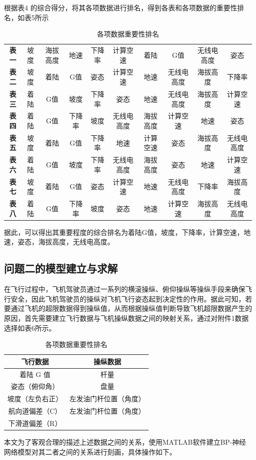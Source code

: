 \documentclass[UTF8]{ctexart}
\begin{document}
	根据表4 的综合得分，将其各项数据进行排名，得到各表和各项数据的重要性排名，如表5所示 \par
	\begin{table}[!ht]
		\centering
		\caption{各项数据重要性排名}
		\begin{tabular}{|c|ccccccccc|}
			\hline
			\textbf{表一 } & 坡度 & 海拔高度 & 地速 & 下降率 & 计算空速 & 着陆 & G值  & 无线电高度  & 姿态  \\
			\textbf{表二 } & 坡度 & 着陆 & G值  & 姿态  & 计算空速 & 地速 & 无线电高度  & 海拔高度 & 下降率 \\ 
			\textbf{表三 } & 着陆 & G值  & 坡度 & 下降率 & 姿态  & 地速 & 无线电高度  & 海拔高度 & 计算空速 \\ 
			\textbf{表四 } & 着陆 & G值  & 下降率 & 坡度 & 无线电高度  & 海拔高度 & 计算空速 & 地速 & 姿态  \\ 
			\textbf{表五 } & 坡度 & 着陆 & G值  & 下降率 & 地速 & 计算空速 & 姿态  & 海拔高度 & 无线电高度  \\ 
			\textbf{表六 } & 着陆 & G值  & 坡度 & 下降率 & 无线电高度  & 海拔高度 & 姿态  & 地速 & 计算空速 \\ 
			\textbf{表七 } & 坡度 & 着陆 & G值  & 姿态  & 计算空速 & 地速 & 无线电高度  & 下降率 & 海拔高度 \\ 
			\textbf{表八 } & 着陆 & G值  & 下降率 & 坡度 & 姿态  & 地速 & 计算空速 & 海拔高度 & 无线电高度 \\ \hline
		\end{tabular}
	\end{table}\par
	据此，可以得出其重要程度的综合排名为着陆G值，坡度，下降率，计算空速，地速，姿态，海拔高度，无线电高度。 \par
	\subsection{问题二的模型建立与求解}
	在飞行过程中，飞机驾驶员通过一系列的横滚操纵、俯仰操纵等操纵手段来确保飞行安全，因此飞机驾驶员的操纵对飞机飞行姿态起到决定性的作用。据此可知，若要通过飞机的超限数据得到操纵值，从而根据操纵值判断导致飞机超限数据产生的原因，首先需要建立飞行数据与飞机操纵数据之间的映射关系，通过对附件1数据选择如表6所示。 \par
	\begin{table}[!ht]
		\centering
		\caption{各项数据重要性排名}
		\begin{tabular}{|c|c|}
			\hline
			\textbf{飞行数据 } & \textbf{操纵数据 } \\ \hline
			着陆 G 值  & 杆量  \\ 
			姿态（俯仰角）  & 盘量  \\ 
			坡度（左负右正）  & 左发油门杆位置（角度）  \\ 
			航向道偏差（C）  & 左发油门杆位置（角度）  \\ 
			下滑道偏差（R） & \\ \hline
		\end{tabular}
	\end{table}\par
	本文为了客观合理的描述上述数据之间的关系，使用MATLAB软件建立BP-神经网络模型对其二者之间的关系进行刻画，具体操作如下。\par
\end{document}
